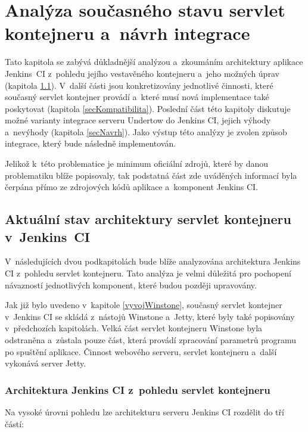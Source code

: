 
\chapter{Analýza současného stavu servlet kontejneru a~návrh integrace}
    Tato kapitola se zabývá důkladnější analýzou a~zkoumáním architektury aplikace Jenkins~CI
    z~pohledu jejího vestavěného kontejneru a~jeho možných úprav (kapitola \ref{secArchitecture}). 
    V~další části jsou konkretizovány jednotlivé činnosti, které současný servlet kontejner provádí
    a~které musí nová implementace také poskytovat (kapitola \ref{secKompatibilita}).
    Poslední část této kapitoly diskutuje možné varianty integrace serveru Undertow do Jenkins CI,
    jejich výhody a~nevýhody (kapitola \ref{secNavrh}). Jako výstup této analýzy je zvolen způsob integrace, který bude
    následně implementován.

    Jelikož k~této problematice je minimum oficiální zdrojů, které by danou problematiku blíže popisovaly, 
    tak podstatná část zde uváděných informací byla čerpána přímo ze zdrojových kódů aplikace a~komponent Jenkins CI.
    
    \section{Aktuální stav architektury servlet kontejneru v~Jenkins~CI}\label{secArchitecture}
        V~následujících dvou podkapitolách bude blíže analyzována architektura
        Jenkins CI z~pohledu servlet kontejneru. Tato analýza je velmi důležitá
        pro pochopení návazností jednotlivých komponent, které budou později upravovány.

        Jak již bylo uvedeno v~kapitole \ref{vyvojWinstone}, současný servlet kontejner 
        v~Jenkins CI se skládá z~nástojů Winstone a~Jetty, které byly také popisovány
        v~předchozích kapitolách. Velká část servlet
        kontejneru Winstone byla odstraněna a~zůstala pouze část, která
        provádí zpracování parametrů
        programu po spuštění aplikace. Činnost webového serveru, servlet kontejneru
        a~další vykonává server Jetty.
        

        \subsection{Architektura Jenkins CI z~pohledu servlet kontejneru} 
            Na vysoké úrovni pohledu lze architekturu serveru Jenkins CI rozdělit do tří částí:
            
